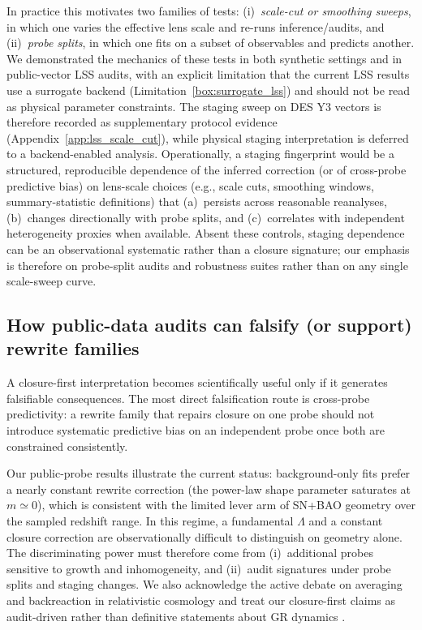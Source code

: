 \documentclass[11pt]{article}
\theoremstyle{definition}
\theoremstyle{plain}
\theoremstyle{remark}
\newcounter{limitation}[section]
\begin{document}
In practice this motivates two families of tests:
(i)~\emph{scale-cut or smoothing sweeps}, in which one varies the effective lens scale and re-runs inference/audits, and
(ii)~\emph{probe splits}, in which one fits on a subset of observables and predicts another.
We demonstrated the mechanics of these tests in both synthetic settings and in public-vector LSS audits, with an explicit limitation that the current LSS results use a surrogate backend (Limitation~\ref{box:surrogate_lss}) and should not be read as physical parameter constraints.
The staging sweep on DES Y3 vectors is therefore recorded as supplementary protocol evidence (Appendix~\ref{app:lss_scale_cut}), while physical staging interpretation is deferred to a backend-enabled analysis.
Operationally, a staging fingerprint would be a structured, reproducible dependence of the inferred correction (or of cross-probe predictive bias) on lens-scale choices (e.g., scale cuts, smoothing windows, summary-statistic definitions) that (a)~persists across reasonable reanalyses, (b)~changes directionally with probe splits, and (c)~correlates with independent heterogeneity proxies when available.
Absent these controls, staging dependence can be an observational systematic rather than a closure signature; our emphasis is therefore on probe-split audits and robustness suites rather than on any single scale-sweep curve.

\subsection{How public-data audits can falsify (or support) rewrite families}\label{sec:discussion:falsify}
A closure-first interpretation becomes scientifically useful only if it generates falsifiable consequences. The most direct falsification route is cross-probe predictivity: a rewrite family that repairs closure on one probe should not introduce systematic predictive bias on an independent probe once both are constrained consistently.

Our public-probe results illustrate the current status: background-only fits prefer a nearly constant rewrite correction (the power-law shape parameter saturates at $m\simeq 0$), which is consistent with the limited lever arm of SN+BAO geometry over the sampled redshift range. In this regime, a fundamental $\Lambda$ and a constant closure correction are observationally difficult to distinguish on geometry alone. The discriminating power must therefore come from (i)~additional probes sensitive to growth and inhomogeneity, and (ii)~audit signatures under probe splits and staging changes. We also acknowledge the active debate on averaging and backreaction in relativistic cosmology and treat our closure-first claims as audit-driven rather than definitive statements about GR dynamics \cite{Clarkson2011Averaging,GreenWald2014FLRW}.
\end{document}

